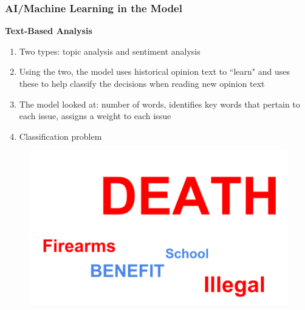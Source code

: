 \documentclass{beamer}
\begin{document}
\begin{frame}
\frametitle{AI/Machine Learning in the Model}
\textbf{Text-Based Analysis}
\begin{enumerate}
	\item Two types: topic analysis and sentiment analysis
	\item Using the two, the model uses historical opinion text to ``learn" and uses these to help classify the decisions when reading new opinion text
	\item The model looked at: number of words, identifies key words that pertain to each issue, assigns a weight to each issue
	\item Classification problem
\end{enumerate}


\begin{figure}[h]
\begin{center}
\includegraphics[width=0.65\columnwidth]{text}
\end{center}
\end{figure}



\end{frame}

\end{document}
